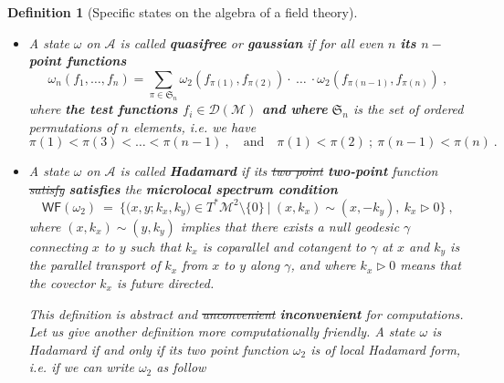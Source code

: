 \documentclass[11pt]{book}
\newcommand{\com}[1]{{\color{red}\bf #1}}
\newcommand{\sbar}[1]{\sout{\color{red} #1}}
\newcommand{\WF}{\mathsf{WF}}
\newcommand{\Acal}{\mathcal{A}}
\newcommand{\Dcal}{\mathcal{D}}
\newcommand{\Mcal}{\mathcal{M}}
\newcommand{\Srak}{\mathfrak{S}}
\newcommand{\Fsf}{\mathsf{F}}
\theoremstyle{break}
\newtheorem{definition}{Definition}[chapter]
\begin{document}
\begin{definition}[Specific states on the algebra of a field theory]
%
\begin{itemize}
\setlength\itemsep{0pt}
\item A state $\omega$ on $\Acal$ is called \textbf{quasifree} or \textbf{gaussian} if for all even $n$ \com{its $n-$point functions}
%
\begin{equation*}
\omega_n\left(f_1,  \dots , f_n  \right) =  \sum_{\pi \in \Srak_n} \omega_2\left( f_{\pi(1)}, f_{\pi(2)} \right) \cdot \ \dots \ \cdot \omega_2\left( f_{\pi(n-1)}, f_{\pi(n)} \right) \ ,
\end{equation*}
%
where
\com{ the test functions $f_i \in \Dcal(\Mcal)$ and where}
 $\Srak_n$ is the set of ordered permutations of $n$ elements, i.e. we have 
%
\begin{equation*}
\pi(1) < \pi(3) < \dots < \pi(n-1) \ , \quad \mbox{and} \quad \pi(1) < \pi(2) \ ;  \ \pi(n-1) < \pi(n) \ . 
\end{equation*}
%
%
%
\item A state $\omega$ on $\Acal$ is called \textbf{Hadamard} if its \sbar{two point} \com{two-point} function \sbar{satisfy} \com{satisfies} the \textbf{microlocal spectrum condition}
%
\begin{equation}
\WF(\omega_2) \ = \ \bigg\{ \bigg( x, y ; k_x, k_y \bigg) \in T^\ast\Mcal^2 \setminus \{0\} \ \bigg| \ (x,k_x) \sim (x,-k_y), \ k_x \triangleright 0 \bigg\} \ ,
\label{eq:microlocal_spectrum_condition}
\end{equation}
%
where $(x,k_x) \sim (y,k_y)$ implies that there exists a null geodesic $\gamma$ connecting $x$ to $y$ such that $k_x$ is coparallel and cotangent to $\gamma$ at $x$ and $k_y$ is the parallel transport of $k_x$ from $x$ to $y$ along $\gamma$, and where $k_x \triangleright 0$ means that the covector $k_x$ is future directed.\par%
%
This definition is abstract and \sbar{unconvenient} \com{inconvenient} for computations. Let us give another definition more computationally friendly. A state $\omega$ is Hadamard if and only if its two point function $\omega_2$ is of local Hadamard form, i.e. if we can write $\omega_2$ as follow

\end{itemize}
\end{definition}
\end{document}
